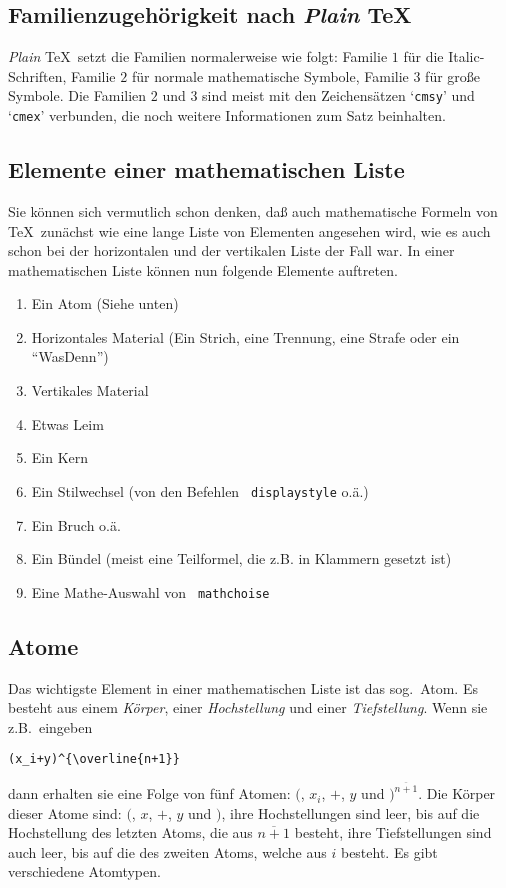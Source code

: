 \subsection{Familienzugeh\"origkeit nach {\em Plain} \TeX}
{\em Plain} \TeX\ setzt die Familien normalerweise wie folgt: Familie $1$
f\"ur die 
Italic-Schriften, Familie $2$ f\"ur normale mathematische
Symbole, Familie $3$ f\"ur gro\ss{}e Symbole. Die Familien $2$ und $3$ sind
meist mit den Zeichens\"atzen `\verb|cmsy|' und `\verb|cmex|' verbunden,
die noch weitere Informationen zum Satz beinhalten.
\subsection{Elemente einer mathematischen Liste}
Sie k\"onnen sich vermutlich schon denken, da\ss{} auch mathematische Formeln
von \TeX\ zun\"achst wie eine lange Liste von Elementen angesehen wird,
wie es auch schon bei der 
horizontalen und der vertikalen Liste der
Fall war. In einer mathematischen Liste k\"onnen nun folgende Elemente
auftreten.
\begin{enumerate}
\item Ein Atom (Siehe unten)
\item Horizontales Material (Ein Strich, eine Trennung, eine Strafe
oder ein ``WasDenn'')
\item Vertikales Material
\item Etwas Leim
\item Ein Kern
\item Ein 
Stilwechsel (von den Befehlen {\tt{} displaystyle} o.\"a.)
\item Ein Bruch o.\"a.
\item Ein B\"undel (meist eine Teilformel, die z.B. in Klammern gesetzt
ist)
\item Eine Mathe-Auswahl von {\tt{} mathchoise}
\end{enumerate}
\subsection{Atome}
Das wichtigste Element in einer mathematischen Liste ist das sog.\
Atom. Es besteht aus einem {\em K\"orper}, einer 
{\em Hochstellung} und
einer {\em Tiefstellung}. Wenn sie z.B.\ eingeben
\begin{verbatim}
(x_i+y)^{\overline{n+1}}
\end{verbatim}
dann erhalten sie eine Folge von f\"unf Atomen: $($, $x_i$, $+$, $y$ und
$)^{\overline{n+1}}$. Die K\"orper dieser Atome sind: $($, $x$, $+$, $y$
und $)$, ihre \index{Hochstellung}Hochstellungen sind leer, bis auf die 
Hochstellung des
letzten Atoms, die aus $\overline{n+1}$ besteht, ihre Tiefstellungen
sind auch leer, bis auf die des zweiten Atoms, welche aus $i$ besteht.
Es gibt verschiedene Atomtypen.


